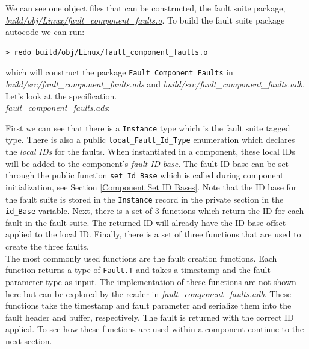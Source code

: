 We can see one object files that can be constructed, the fault suite package, \textit{\url{build/obj/Linux/fault\_component\_faults.o}}. To build the fault suite package autocode we can run:

\vspace{5mm} %
\begin{verbatim}
> redo build/obj/Linux/fault_component_faults.o
\end{verbatim}
\vspace{5mm} %

which will construct the package \texttt{Fault\_Component\_Faults} in \textit{build/src/fault\_component\_faults.ads} and \textit{build/src/fault\_component\_faults.adb}. Let's look at the specification. \\

\textit{fault\_component\_faults.ads}:

First we can see that there is a \texttt{Instance} type which is the fault suite tagged type. There is also a public \texttt{local\_Fault\_Id\_Type} enumeration which declares the \textit{local IDs} for the faults. When instantiated in a component, these local IDs will be added to the component's \textit{fault ID base}. The fault ID base can be set through the public function \texttt{set\_Id\_Base} which is called during component initialization, see Section \ref{Component Set ID Bases}. Note that the ID base for the fault suite is stored in the \texttt{Instance} record in the private section in the \texttt{id\_Base} variable. Next, there is a set of 3 functions which return the ID for each fault in the fault suite. The returned ID will already have the ID base offset applied to the local ID. Finally, there is a set of three functions that are used to create the three faults. \\

The most commonly used functions are the fault creation functions. Each function returns a type of \texttt{Fault.T} and takes a timestamp and the fault parameter type as input. The implementation of these functions are not shown here but can be explored by the reader in \textit{fault\_component\_faults.adb}. These functions take the timestamp and fault parameter and serialize them into the fault header and buffer, respectively. The fault is returned with the correct ID applied. To see how these functions are used within a component continue to the next section.

